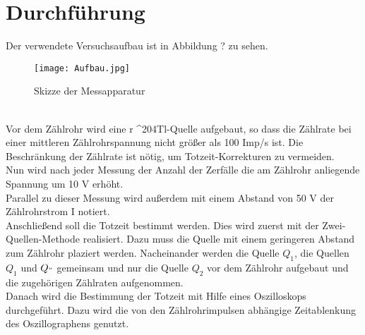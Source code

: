 \section{Durchführung}
\label{sec:Durchführung}

Der verwendete Versuchsaufbau ist in Abbildung ? zu sehen.\\
\begin{figure}[h]
    \centering
    \texttt{[image: Aufbau.jpg]}
    \caption{Skizze der Messapparatur}
    \label{fig:Skizze der Messapparatur}
\end{figure}\\
Vor dem Zählrohr wird eine r ^{204}Tl-Quelle aufgebaut, so dass die Zählrate bei einer mittleren Zählrohrspannung nicht größer als 100 Imp/s ist.
Die Beschränkung der Zählrate ist nötig, um Totzeit-Korrekturen zu vermeiden.\\
Nun wird nach jeder Messung der Anzahl der Zerfälle die am Zählrohr anliegende Spannung um 10 V erhöht.\\
Parallel zu dieser Messung wird außerdem mit einem Abstand von 50 V der Zählrohrstrom I notiert.\\
Anschließend soll die Totzeit bestimmt werden. Dies wird zuerst mit der Zwei-Quellen-Methode realisiert. Dazu muss die Quelle mit einem geringeren Abstand zum Zählrohr plaziert werden. Nacheinander werden die Quelle $Q_1$, die Quellen $Q_1$ und $Q_"$ gemeinsam und nur die Quelle $Q_2$ vor dem Zählrohr aufgebaut
und die zugehörigen Zählraten aufgenommen.\\
Danach wird die Bestimmung der Totzeit mit Hilfe eines Oszilloskops durchgeführt. Dazu wird die von den Zählrohrimpulsen abhängige Zeitablenkung des Oszillographens genutzt.\\
